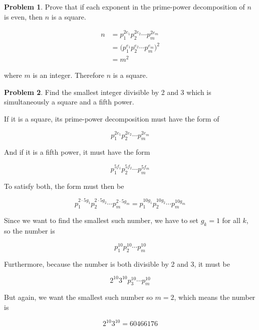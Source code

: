 \documentclass{article}
\theoremstyle{definition}
\newtheorem{problem}{Problem}[section]
\begin{document}
  \begin{problem}
    Prove that if each exponent in the prime-power decomposition of $n$ is even, then $n$ is a square.
  \end{problem}
  
  \begin{align*}
    n &= p_1^{2e_1}p_2^{2e_2} \cdots p_m^{2e_m} \\
    &= \big(p_1^{e_1}p_2^{e_2} \cdots p_m^{e_m}\big)^2 \\
    &= m^2
  \end{align*}
  
  where $m$ is an integer. Therefore $n$ is a square.
  
  \begin{problem}
    Find the smallest integer divisible by 2 and 3 which is simultaneously a square and a fifth power.
  \end{problem}
  
  If it is a square, its prime-power decomposition must have the form of
  
  \begin{equation*}
    p_1^{2e_1}p_2^{2e_2} \cdots p_m^{2e_m}
  \end{equation*}
  
  And if it is a fifth power, it must have the form
  
  \begin{equation*}
    p_1^{5f_1}p_2^{5f_2} \cdots p_m^{5f_m}
  \end{equation*}
  
  To satisfy both, the form must then be
  
  \begin{equation*}
    p_1^{2\cdot5g_1}p_2^{2\cdot5g_2} \cdots p_m^{2\cdot5g_m} = p_1^{10g_1}p_2^{10g_2} \cdots p_m^{10g_m}
  \end{equation*}
  
  Since we want to find the smallest such number, we have to set $g_k = 1$ for all $k$, so the number is
  
  \begin{equation*}
    p_1^{10} p_2^{10} \cdots p_m^{10}
  \end{equation*}
  
  Furthermore, because the number is both divisible by 2 and 3, it must be
  
  \begin{equation*}
    2^{10} 3^{10} p_3^{10} \cdots p_m^{10}
  \end{equation*}
  
  But again, we want the smallest such number so $m = 2$, which means the number is
  
  \begin{equation*}
    2^{10} 3^{10} = 60466176
  \end{equation*}
\end{document}
